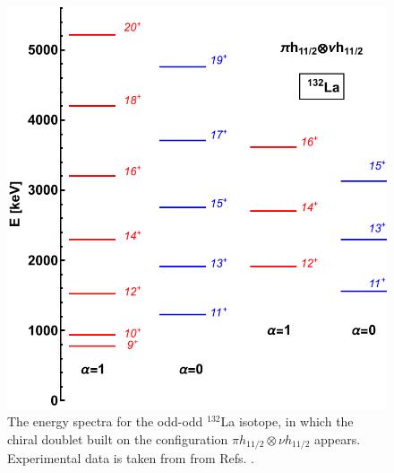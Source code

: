 \begin{figure}
    \centering
    \includegraphics[scale=0.6]{Chapters/Figures/chiral_bands_132La.pdf}
    \caption{The energy spectra for the odd-odd $^{132}$La isotope, in which the chiral doublet built on the configuration $\pi h_{11/2}\otimes\nu h_{11/2}$ appears. Experimental data is taken from from Refs. \cite{grodner2004dsam,grodner2005lifetime}.}
    \label{chiral-bands-2}
\end{figure}

